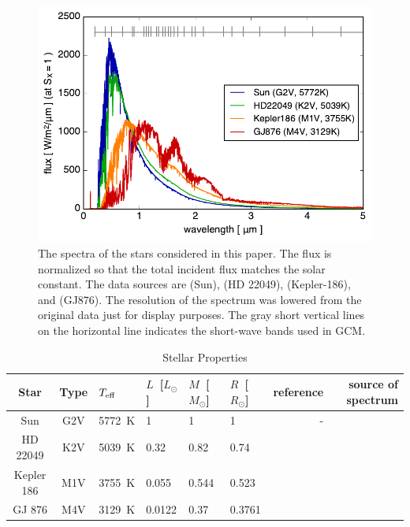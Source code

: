 \documentclass[11pt,numberedappendix,twocolappendix,]{emulateapj}
\begin{document}
\begin{figure}[!bh]
    \begin{center}
    \includegraphics[width=\hsize]{fig/star_spectra.pdf}
    \end{center}
\caption{The spectra of the stars considered in this paper. The flux is normalized so that the total incident flux matches the solar constant. The data sources are \citet{Kurucz1995} (Sun), \citet{Segura2003} (HD 22049), \citet{Allard2012} (Kepler-186), and \citet{Domagal-Goldman2014} (GJ876). The resolution of the spectrum was lowered from the original data just for display purposes. The gray short vertical lines on the horizontal line indicates the short-wave bands used in GCM. }
\label{fig:star_spectra}
\end{figure}



\begin{table}[btp]
\caption{Stellar Properties}
\begin{center}
\begin{tabular}{ccllllrr} \hline \hline
%
Star & Type & $T_{\rm eff}$ & $L$~[$L_{\odot}$] & $M$~[$M_{\odot}$] & $R$~[$R_{\odot}$] & reference & source of spectrum \\ \hline
%
Sun & G2V & 5772~K & 1 & 1 & 1 & - & \citet{Kurucz1995} \\ 
%
HD 22049 & K2V & 5039~K & 0.32 & 0.82 & 0.74 & \citet{Baines2012} & \citet{Segura2003} \\
%
Kepler 186 & M1V & 3755~K & 0.055 & 0.544 & 0.523 & \citet{Torres2015} & \citet{Allard2012} \\
%
GJ 876 & M4V & 3129~K & 0.0122 & 0.37 & 0.3761 & \citet{vonBraun2014} & \citet{Domagal-Goldman2014} \\ \hline
\end{tabular}
\end{center}
\label{tbl:stellar_properties}
\end{table}%
\end{document}
